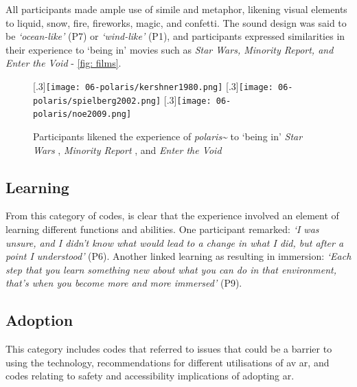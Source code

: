 All participants made ample use of simile and metaphor, likening visual elements to liquid, snow, fire, fireworks, magic, and confetti. The sound design was said to be \textit{`ocean-like'} (P7) or \textit{`wind-like'} (P1), and participants expressed similarities in their experience to `being in' movies such as \textit{Star Wars, Minority Report, and Enter the Void} - \autoref{fig: films}.

\begin{figure}
    \centering
    \captionsetup{justification=centering, margin=1.5cm}
    [.3\linewidth]{\texttt{[image: 06-polaris/kershner1980.png]}}
    \hfill
    [.3\linewidth]{\texttt{[image: 06-polaris/spielberg2002.png]}}
    \hfill
    [.3\linewidth]{\texttt{[image: 06-polaris/noe2009.png]}}
    \caption{Participants likened the experience of \textit{polaris\textasciitilde{}} to `being in' \textit{Star Wars} , \textit{Minority Report} , and \textit{Enter the Void} }\label{fig: films}
\end{figure}

\subsection{Learning}\label{sec: polaris-feedback-learning}
From this category of codes, is clear that the experience involved an element of learning different functions and abilities. One participant remarked: \textit{`I was unsure, and I didn't know what would lead to a change in what I did, but after a point I understood'} (P6). Another linked learning as resulting in immersion: \textit{`Each step that you learn something new about what you can do in that environment, that's when you become more and more immersed'} (P9).

\subsection{Adoption}\label{sec: polaris-feedback-adoption}
This category includes codes that referred to issues that could be a barrier to using the technology, recommendations for different utilisations of \gls{av} \gls{ar}, and codes relating to safety and accessibility implications of adopting \gls{ar}.


